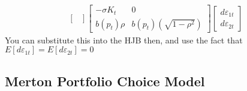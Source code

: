 \documentclass[12pt]{article}
\begin{document}
\begin{itemize}
\[\begin{split}
\begin{bmatrix}
        \end{bmatrix}\begin{bmatrix}
        -\sigma K_t & 0 \\
        b(p_t)\rho & b(p_t)\left(\sqrt{1-\rho^2}\right)
        \end{bmatrix}\begin{bmatrix}
        d\varepsilon_{1t} \\
        d\varepsilon_{2t}
        \end{bmatrix}
    \end{split}\]
    You can substitute this into the HJB then, and use the fact that $E[d\varepsilon_{1t}] = E[d\varepsilon_{2t}] = 0$
\end{itemize}

\subsection{Merton Portfolio Choice Model}
\end{document}
